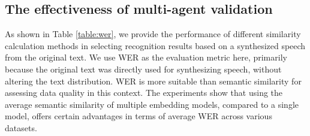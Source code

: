 \documentclass[11pt]{article}
\begin{document}
	\subsection{The effectiveness of multi-agent validation} \label{appendix:multi_agent_validation}
	
	As shown in Table \ref{table:wer}, we provide the performance of different similarity calculation methods in selecting recognition results based on a synthesized speech from the original text. We use WER as the evaluation metric here, primarily because the original text was directly used for synthesizing speech, without altering the text distribution. WER is more suitable than semantic similarity for assessing data quality in this context. The experiments show that using the average semantic similarity of multiple embedding models, compared to a single model, offers certain advantages in terms of average WER across various datasets.
	\begin{table}[htb]
	\centering
	\caption{Human evaluation results of speech command quality after rewriting using different methods.}
	\label{table:human_eval_1}
\end{table}
	
\end{document}
